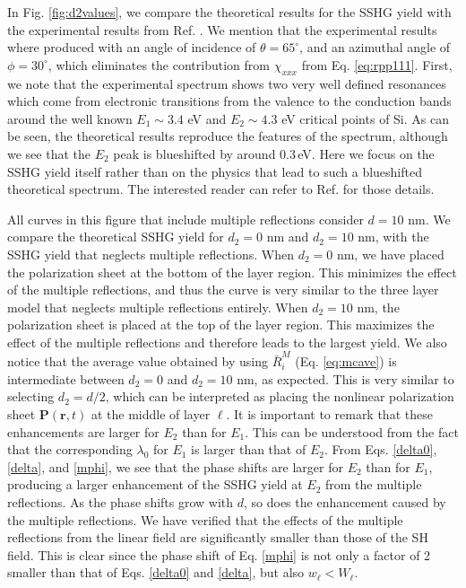 In Fig. \ref{fig:d2values}, we compare the theoretical results for the SSHG yield with the experimental results from Ref. \cite{mejiaPRB02}. We mention that the experimental results where produced with an angle of incidence of $\theta=65^\circ$, and an azimuthal angle of $\phi=30^\circ$, which eliminates the contribution from $\chi_{xxx}$ from Eq. \eqref{eq:rpp111}. First, we note that the experimental spectrum shows two very well defined resonances which come from electronic transitions from the valence to the conduction bands around the well known $E_{1}\sim 3.4$ eV and $E_{2}\sim 4.3$ eV critical points of Si.\cite{yubook} As can be seen, the theoretical results reproduce the features of the spectrum, although we see that the $E_{2}$ peak is blueshifted by around 0.3\,eV. Here we focus on the SSHG yield itself rather than on the physics that lead to such a blueshifted theoretical spectrum. The interested reader can refer to Ref. \cite{andersonPRB16} for those details.

All curves in this figure that include multiple reflections consider $d = 10$ nm. We compare the theoretical SSHG yield for $d_{2} = 0$ nm and $d_{2} = 10$ nm, with the SSHG yield that neglects multiple reflections. When $d_{2} = 0$ nm, we have placed the polarization sheet at the bottom of the layer region. This minimizes the effect of the multiple reflections, and thus the curve is very similar to the three layer model that neglects multiple reflections entirely. When $d_{2} = 10$ nm, the polarization sheet is placed at the top of the layer region. This maximizes the effect of the multiple reflections and therefore leads to the largest yield. We also notice that the average value obtained by using $\bar{R}^{M}_{i}$ (Eq. \eqref{eq:mcave}) is intermediate between $d_{2} = 0$ and $d_{2} = 10$ nm, as expected. This is very similar to selecting $d_{2} = d/2$, which can be interpreted as placing the nonlinear polarization sheet $\mathbf{P}(\mathbf{r},t)$ at the middle of layer $\ell$. It is important to remark that these enhancements are larger for $E_{2}$ than for $E_{1}$. This can be understood from the fact that the corresponding $\lambda_{0}$ for $E_{1}$ is larger than that of $E_{2}$. From Eqs. \eqref{delta0}, \eqref{delta}, and \eqref{mphi}, we see that the phase shifts are larger for $E_{2}$ than for $E_{1}$, producing a larger enhancement of the SSHG yield at $E_{2}$ from the multiple reflections. As the phase shifts grow with $d$, so does the enhancement caused by the multiple reflections. We have verified that the effects of the multiple reflections from the linear field are significantly smaller than those of the SH field. This is clear since the phase shift of Eq. \eqref{mphi} is not only a factor of 2 smaller than that of Eqs. \eqref{delta0} and \eqref{delta}, but also $w_\ell < W_\ell$.

